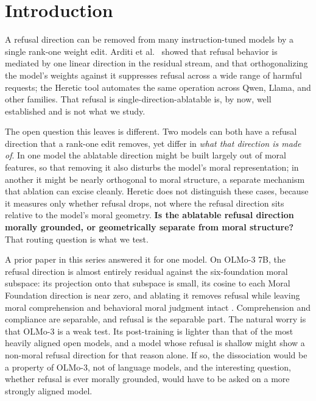 \section{Introduction}\label{introduction}

A refusal direction can be removed from many instruction-tuned models by a single
rank-one weight edit. Arditi et al.~\citep{arditi2024refusal} showed that refusal
behavior is mediated by one linear direction in the residual stream, and that
orthogonalizing the model's weights against it suppresses refusal across a wide
range of harmful requests; the Heretic tool \citep{pew2025heretic} automates the
same operation across Qwen, Llama, and other families. That refusal is
single-direction-ablatable is, by now, well established and is not what we study.

The open question this leaves is different. Two models can both have a refusal
direction that a rank-one edit removes, yet differ in \emph{what that direction is
made of}. In one model the ablatable direction might be built largely out of
moral features, so that removing it also disturbs the model's moral
representation; in another it might be nearly orthogonal to moral structure, a
separate mechanism that ablation can excise cleanly. Heretic does not distinguish
these cases, because it measures only whether refusal drops, not where the
refusal direction sits relative to the model's moral geometry. \textbf{Is the ablatable
refusal direction morally grounded, or geometrically separate from moral
structure?} That routing question is what we test.

A prior paper in this series answered it for one model. On OLMo-3 7B, the refusal
direction is almost entirely residual against the six-foundation moral subspace:
its projection onto that subspace is small, its cosine to each Moral Foundation
direction is near zero, and ablating it removes refusal while leaving moral
comprehension and behavioral moral judgment intact
\citep{reblitzrichardson2026alignment}. Comprehension and compliance are
separable, and refusal is the separable part. The natural worry is that OLMo-3 is
a weak test. Its post-training is lighter than that of the most heavily aligned
open models, and a model whose refusal is shallow might show a non-moral refusal
direction for that reason alone. If so, the dissociation would be a property of
OLMo-3, not of language models, and the interesting question, whether refusal is
ever morally grounded, would have to be asked on a more strongly aligned model.


